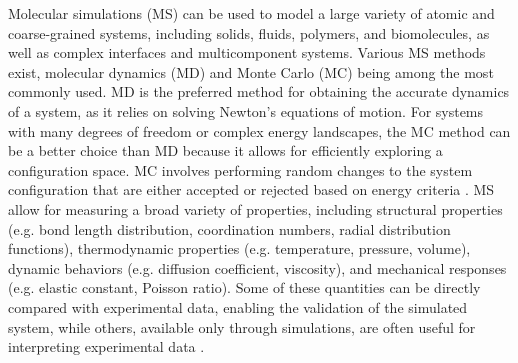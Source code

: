 \documentclass[9pt,tutorial]{livecoms}
\begin{document}

Molecular simulations (MS) can be used to model a large variety of atomic and coarse-grained systems, including solids, fluids, polymers, and biomolecules, as well as complex interfaces and multicomponent systems. Various MS methods exist, molecular dynamics (MD) and Monte Carlo (MC) being among the most commonly used. MD is the preferred method for obtaining the accurate dynamics of a system, as it relies on solving Newton's equations of motion. For systems with many degrees of freedom or complex energy landscapes, the MC method can be a better choice than MD because it allows for efficiently exploring a configuration space. MC involves performing random changes to the system configuration that are either accepted or rejected based on energy criteria \cite{frenkel2023understanding, allen2017computer}. MS allow for measuring a broad variety of properties, including structural properties (e.g. bond length distribution, coordination numbers, radial distribution functions), thermodynamic properties (e.g. temperature, pressure, volume), dynamic behaviors (e.g. diffusion coefficient, viscosity), and mechanical responses (e.g. elastic constant, Poisson ratio). Some of these quantities can be directly compared with experimental data, enabling the validation of the simulated system, while others, available only through simulations, are often useful for interpreting experimental data  \cite{van2008molecular}.
\end{document}
